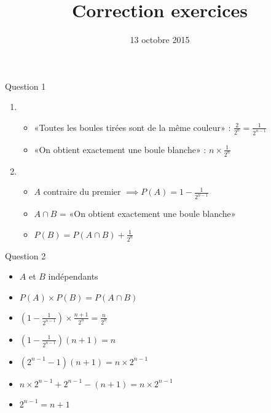\documentclass[12pt,french]{beamer}
\title{Correction exercices}
\date{13 octobre 2015}
\begin{document}
\begin{frame}
  \maketitle
\end{frame}

\begin{frame}
  \begin{block}{Question 1}
    \begin{enumerate}[label=\alph*)]
      \item \begin{itemize}
          \item «Toutes les boules tirées sont de la même couleur» :
            $\frac2{2^n} = \frac{1}{2^{n-1}}$
          \item «On obtient exactement une boule blanche» :
            $n\times\frac1{2^n}$
        \end{itemize}
      \item \begin{itemize}
          \item $A$ contraire du premier $\implies P(A) = 1 -
            \frac1{2^{n-1}}$
          \item $A\cap B$ = «On obtient exactement une boule blanche»
          \item $P(B) = P(A\cap B) + \frac1{2^n}$
        \end{itemize}
    \end{enumerate}
  \end{block}
\end{frame}

\begin{frame}
  \begin{block}{Question 2}
    \begin{itemize}[label=$\iff$]
      \item $A$ et $B$ indépendants
      \item $P(A)\times P(B) = P(A\cap B)$
      \item $\left(1 - \frac1{2^{n-1}}\right)\times \frac{n+1}{2^n} =
        \frac{n}{2^n}$
      \item $\left(1 - \frac1{2^{n-1}}\right)(n+1) = n$
      \item $\left(2^{n-1} - 1\right)(n+1) = n\times 2^{n-1}$
      \item $n\times 2^{n-1} + 2^{n-1} - (n+1) = n\times 2^{n-1}$
      \item $2^{n-1} = n+1$
    \end{itemize}
  \end{block}
\end{frame}
\end{document}
